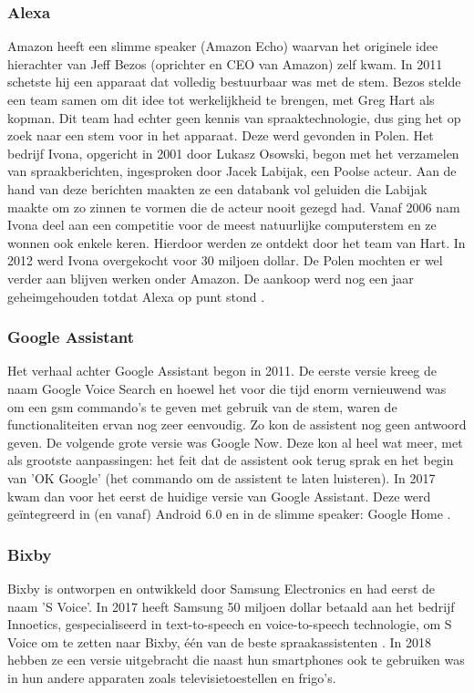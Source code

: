 \documentclass{hogent-article}
\begin{document}
\subsubsection{Alexa}
Amazon heeft een slimme speaker (Amazon Echo) waarvan het originele idee hierachter van Jeff Bezos (oprichter en CEO van Amazon) zelf kwam. In 2011 schetste hij een apparaat dat volledig bestuurbaar was met de stem. Bezos stelde een team samen om dit idee tot werkelijkheid te brengen, met Greg Hart als kopman. Dit team had echter geen kennis van spraaktechnologie, dus ging het op zoek naar een stem voor in het apparaat. Deze werd gevonden in Polen. Het bedrijf Ivona, opgericht in 2001 door Lukasz Osowski, begon met het verzamelen van spraakberichten, ingesproken door Jacek Labijak, een Poolse acteur. Aan de hand van deze berichten maakten ze een databank vol geluiden die Labijak maakte om zo zinnen te vormen die de acteur nooit gezegd had. Vanaf 2006 nam Ivona deel aan een competitie voor de meest natuurlijke computerstem en ze wonnen ook enkele keren. Hierdoor werden ze ontdekt door het team van Hart. In 2012 werd Ivona overgekocht voor 30 miljoen dollar. De Polen mochten er wel verder aan blijven werken onder Amazon. De aankoop werd nog een jaar geheimgehouden totdat Alexa op punt stond \autocite{Stone2021}.

\subsubsection{Google Assistant}
Het verhaal achter Google Assistant begon in 2011. De eerste versie kreeg de naam Google Voice Search en hoewel het voor die tijd enorm vernieuwend was om een gsm commando's te geven met gebruik van de stem, waren de functionaliteiten ervan nog zeer eenvoudig. Zo kon de assistent nog geen antwoord geven. De volgende grote versie was Google Now. Deze kon al heel wat meer, met als grootste aanpassingen: het feit dat de assistent ook terug sprak en het begin van 'OK Google' (het commando om de assistent te laten luisteren). In 2017 kwam dan voor het eerst de huidige versie van Google Assistant. Deze werd geïntegreerd in (en vanaf) Android 6.0 en in de slimme speaker: Google Home \autocite{Jansen2018}.

\subsubsection{Bixby}
Bixby is ontworpen en ontwikkeld door Samsung Electronics en had eerst de naam 'S Voice'. In 2017 heeft Samsung 50 miljoen dollar betaald aan het bedrijf Innoetics, gespecialiseerd in text-to-speech en voice-to-speech technologie, om S Voice om te zetten naar Bixby, één van de beste spraakassistenten \autocite{Reigh2017}. In 2018 hebben ze een versie uitgebracht die naast hun smartphones ook te gebruiken was in hun andere apparaten zoals televisietoestellen en frigo's.
\end{document}
